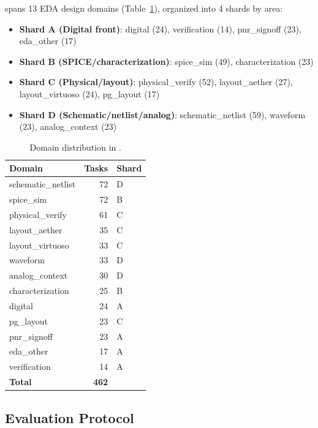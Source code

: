 \bench{} spans 13 EDA design domains (Table~\ref{tab:domain-distribution}), organized into 4 shards by area:

\begin{itemize}
    \item \textbf{Shard A (Digital front)}: digital (24), verification (14), pnr\_signoff (23), eda\_other (17)
    \item \textbf{Shard B (SPICE/characterization)}: spice\_sim (49), characterization (23)
    \item \textbf{Shard C (Physical/layout)}: physical\_verify (52), layout\_aether (27), layout\_virtuoso (24), pg\_layout (17)
    \item \textbf{Shard D (Schematic/netlist/analog)}: schematic\_netlist (59), waveform (23), analog\_context (23)
\end{itemize}

\begin{table}[ht]
\centering
\small
\caption{Domain distribution in \bench.}
\label{tab:domain-distribution}
\begin{tabular}{@{}lrl@{}}
\toprule
\textbf{Domain} & \textbf{Tasks} & \textbf{Shard} \\
\midrule
schematic\_netlist & 72 & D \\
spice\_sim & 72 & B \\
physical\_verify & 61 & C \\
layout\_aether & 35 & C \\
layout\_virtuoso & 33 & C \\
waveform & 33 & D \\
analog\_context & 30 & D \\
characterization & 25 & B \\
digital & 24 & A \\
pg\_layout & 23 & C \\
pnr\_signoff & 23 & A \\
eda\_other & 17 & A \\
verification & 14 & A \\
\midrule
\textbf{Total} & \textbf{462} & \\
\bottomrule
\end{tabular}
\end{table}

\subsection{Evaluation Protocol}
\label{sec:eval-protocol}


